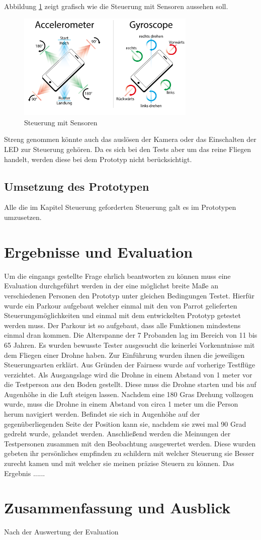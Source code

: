 \documentclass{article}
\begin{document}
Abbildung \ref{fig:gameplay} zeigt grafisch wie die Steuerung mit Sensoren aussehen soll. 

\begin{figure}
\begin{minipage}[b]{1.0\linewidth}
  \centering
\centerline{\includegraphics[width= 85mm]{gameplay}}
\end{minipage}
\caption{Steuerung mit Sensoren}
\label{fig:gameplay}
\end{figure}


Streng genommen könnte auch das auslösen der Kamera oder das Einschalten der LED zur Steuerung gehören. Da es sich bei den Tests aber um das reine Fliegen handelt, werden diese bei dem Prototyp nicht berücksichtigt.

\subsection{Umsetzung des Prototypen} 
Alle die im Kapitel Steuerung geforderten Steuerung galt es im Prototypen umzusetzen. 

\section{Ergebnisse und Evaluation}
Um die eingangs gestellte Frage ehrlich beantworten zu können muss eine Evaluation durchgeführt werden in der eine möglichst breite Maße an verschiedenen Personen den Prototyp unter gleichen Bedingungen Testet. Hierfür wurde ein Parkour aufgebaut welcher einmal mit den von Parrot gelieferten Steuerungsmöglichkeiten und einmal mit dem entwickelten Prototyp getestet werden muss. Der Parkour ist so aufgebaut, dass alle Funktionen mindestens einmal dran kommen. 
Die Alterspanne der 7 Probanden lag im Bereich von 11 bis 65 Jahren. Es wurden bewusste Tester ausgesucht die keinerlei Vorkenntnisse mit dem Fliegen einer Drohne haben. 
Zur Einführung wurden ihnen die jeweiligen Steuerungsarten erklärt. Aus Gründen der Fairness wurde auf vorherige Testflüge verzichtet.
Als Ausgangslage wird die Drohne in einem Abstand von 1 meter vor die Testperson aus den Boden gestellt. Diese muss die Drohne starten und bis auf Augenhöhe in die Luft steigen lassen. Nachdem eine 180 Gras Drehung vollzogen wurde, muss die Drohne in einem Abstand von circa 1 meter um die Person herum navigiert werden. Befindet sie sich in Augenhöhe auf der gegenüberliegenden Seite der Position kann sie, nachdem sie zwei mal 90 Grad gedreht wurde, gelandet werden.
Anschließend werden die Meinungen der Testpersonen zusammen mit den Beobachtung ausgewertet werden. Diese wurden gebeten ihr persönliches empfinden zu schildern mit welcher Steuerung sie Besser zurecht kamen und mit welcher sie meinen präzise Steuern zu können.
Das Ergebnis ......
\section{Zusammenfassung und Ausblick}
Nach der Auswertung der Evaluation 
{}

\end{document}
